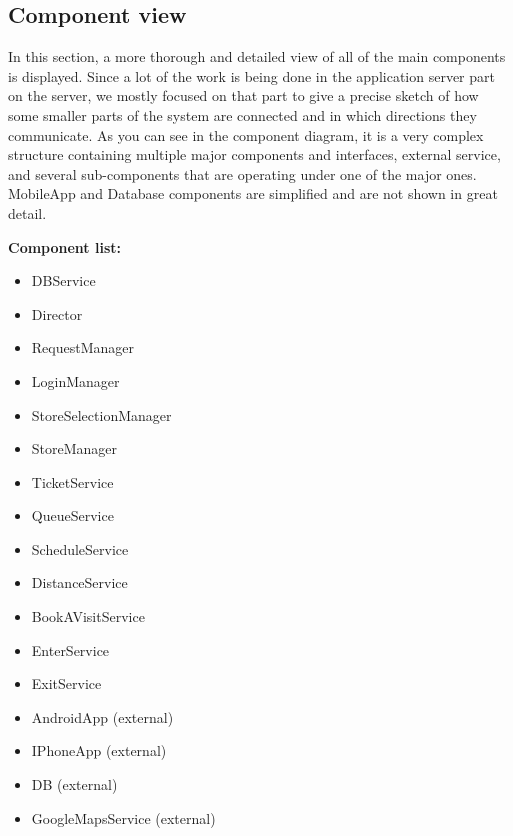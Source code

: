 \newpage 

\subsection{Component view}
\label{sec:componentview}

\hspace{\parindent}In this section, a more thorough and detailed view of all of the main components is displayed. Since a lot of the work is being done in the application server part on the server, we mostly focused on that part to give a precise sketch of how some smaller parts of the system are connected and in which directions they communicate. As you can see in the component diagram, it is a very complex structure containing multiple major components and interfaces, external service, and several sub-components that are operating under one of the major ones. MobileApp and Database components are simplified and are not shown in great detail. \newline

\textbf{Component list:}
\begin{itemize}
\item DBService
\item Director
\item RequestManager
\item LoginManager 
\item StoreSelectionManager 
\item StoreManager
\item TicketService 
\item QueueService 
\item ScheduleService
\item DistanceService 
\item BookAVisitService
\item EnterService 
\item ExitService 
\item AndroidApp (external) 
\item IPhoneApp (external)
\item DB (external) 
\item GoogleMapsService (external) 
\end{itemize}

